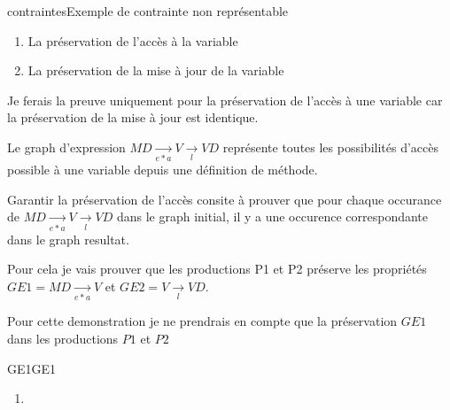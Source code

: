 \documentclass[a4paper, 12pt]{article}
\begin{document}
\begin{figu}{contraintes}{Exemple de contrainte non représentable}
{  \begin{enumerate}
    \item La préservation de l'accès à la variable
    \item La préservation de la mise à jour de la variable
  \end{enumerate}

  Je ferais la preuve uniquement pour la préservation de l'accès à une variable car la préservation de la mise à jour est identique.

  Le graph d'expression  \(MD \underset{e * a}{\rightarrow} V \underset{l}{\rightarrow}  VD\) représente toutes les possibilités d'accès possible à une variable depuis une définition de méthode.

  Garantir la préservation de l'accès consite à prouver que pour chaque occurance de \(MD \underset{e * a}{\rightarrow} V \underset{l}{\rightarrow} VD\) dans le graph initial, il y a une occurence correspondante dans le graph resultat.

  Pour cela je vais prouver que les productions P1 et P2 préserve les propriétés \(GE1 = MD \underset{e * a}{\rightarrow} V \) et  \(GE2 = V \underset{l}{\rightarrow}  VD\).

  Pour cette demonstration je ne prendrais en compte que la préservation $GE1$ dans les productions $P1$ et $P2$

  \begin{myfig}{GE1}{GE1}
    \begin{center}
    \end{center}
  \end{myfig}

  \begin{enumerate}
    \item


\end{enumerate}}
\end{figu}
\end{document}
